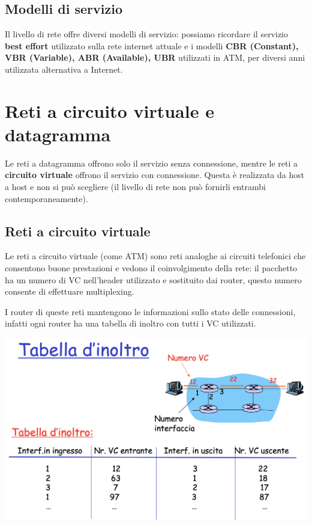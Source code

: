 \documentclass{report}
\begin{document}
\hypertarget{header-n13}{%
\subsection{Modelli di servizio}\label{header-n13}}

Il livello di rete offre diversi modelli di servizio: possiamo ricordare
il servizio \textbf{best effort} utilizzato sulla rete internet attuale
e i modelli \textbf{CBR (Constant), VBR (Variable), ABR (Available),
UBR} utilizzati in ATM, per diversi anni utilizzata alternativa a
Internet.

\hypertarget{header-n15}{%
\section{Reti a circuito virtuale e datagramma}\label{header-n15}}

Le reti a datagramma offrono solo il servizio senza connessione, mentre
le reti a \textbf{circuito virtuale} offrono il servizio con
connessione. Questa è realizzata da host a host e non si può scegliere
(il livello di rete non può fornirli entrambi contemporaneamente).

\hypertarget{header-n17}{%
\subsection{Reti a circuito virtuale}\label{header-n17}}

Le reti a circuito virtuale (come ATM) sono reti analoghe ai circuiti
telefonici che consentono buone prestazioni e vedono il coinvolgimento
della rete: il pacchetto ha un numero di VC nell'header utilizzato e
sostituito dai router, questo numero consente di effettuare
multiplexing.

I router di queste reti mantengono le informazioni sullo stato delle
connessioni, infatti ogni router ha una tabella di inoltro con tutti i
VC utilizzati.

\begin{center}
		\includegraphics[width=0.7\linewidth]{circuiti-virtuali}
	\end{center}
\end{document}
